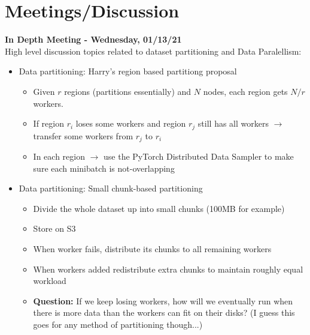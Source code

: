 \chapter{Meetings/Discussion}
\label{chap:meetings}

\textbf{In Depth Meeting - Wednesday, 01/13/21} \\
High level discussion topics related to dataset partitioning and Data Paralellism:
\begin{itemize}
    \item Data partitioning: Harry's region based partitiong proposal
    \begin{itemize}
        \item Given $r$ regions (partitions essentially) and $N$ nodes, each
          region gets $N/r$ workers.
        \item If region $r_i$ loses some workers and region $r_j$ still has all
          workers $\rightarrow$ transfer some workers from $r_j$ to $r_i$
        \item In each region $\rightarrow$ use the PyTorch Distributed Data Sampler
          to make sure each minibatch is not-overlapping
    \end{itemize}

    \item Data partitioning: Small chunk-based partitioning
    \begin{itemize}
        \item Divide the whole dataset up into small chunks (100MB for example)
        \item Store on S3
        \item When worker fails, distribute its chunks to all remaining workers
        \item When workers added redistribute extra chunks to maintain roughly equal
          workload
        \item \textbf{Question:} If we keep losing workers, how will we eventually run
          when there is more data than the workers can fit on their disks? (I guess
          this goes for any method of partitioning though...)
    \end{itemize}
\end{itemize}

